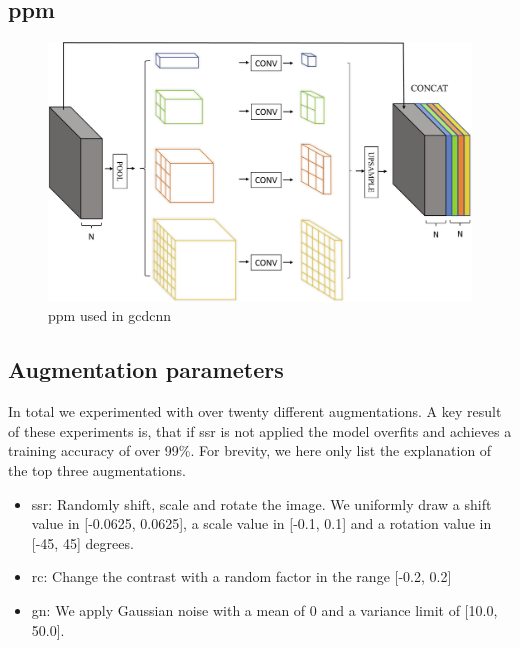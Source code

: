 \appendix

\subsection{\acrlong{ppm}}

\begin{figure}[H]
\centering
\includegraphics[width=1.0\linewidth]{images/pyrmid-pooling.jpg}
\caption{\acrlong{ppm} used in \acrshort{gcdcnn} \cite{gcdcnn}}
\label{fig:ppm}
\end{figure}

\subsection{Augmentation parameters}
In total we experimented with over twenty different augmentations. A key result of these experiments is, that if \acrfull{ssr} is not applied the model overfits and achieves a training accuracy of over 99\%. For brevity, we here only list the explanation of the top three augmentations.
\begin{itemize}
    \item \acrfull{ssr}: Randomly shift, scale and rotate the image. We uniformly draw a shift value in [-0.0625, 0.0625], a scale value in [-0.1, 0.1] and a rotation value in [-45, 45] degrees. %
    \item \acrfull{rc}: Change the contrast with a random factor in the range  [-0.2, 0.2]
    \item \acrfull{gn}: We apply Gaussian noise with a mean of 0 and a variance limit of [10.0, 50.0]. %
\end{itemize}

